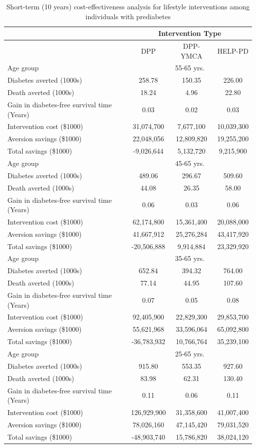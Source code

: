 \documentclass[fleqn,10pt]{wlscirep}
\begin{document}
\begin{table}[ht]
\centering
\begin{tabular}{lccc}
\hline
& \multicolumn{3}{c}{Intervention Type}\\
\hline
& DPP & DPP-YMCA & HELP-PD\\
\hline
Age group & \multicolumn{3}{c}{55-65 yrs.}\\
\hline
Diabetes averted (1000s) & 258.78 & 150.35 & 226.00\\
Death averted (1000s) & 18.24 & 4.96 & 22.80\\
Gain in diabetes-free survival time (Years) & 0.03 & 0.02 & 0.03\\
Intervention cost (\$1000) & 31,074,700 & 7,677,100 & 10,039,300\\
Aversion savings (\$1000) & 22,048,056 & 12,809,820 & 19,255,200\\
Total savings (\$1000) & -9,026,644 & 5,132,720 & 9,215,900\\
\hline
Age group & \multicolumn{3}{c}{45-65 yrs.}\\
\hline
Diabetes averted (1000s) & 489.06 &	296.67 &	509.60\\
Death averted (1000s) & 44.08 &	26.35 &	58.00\\
Gain in diabetes-free survival time (Years) & 0.06 & 0.03 &	0.06\\
Intervention cost (\$1000) & 62,174,800 &	15,361,400 &	20,088,000\\
Aversion savings (\$1000) & 41,667,912 &	25,276,284 &	43,417,920\\
Total savings (\$1000) & -20,506,888 &	9,914,884 &	23,329,920\\
\hline
Age group & \multicolumn{3}{c}{35-65 yrs.}\\
\hline
Diabetes averted (1000s) & 652.84 &	394.32 &	764.00\\
Death averted (1000s) & 77.14 &	44.95 &	107.60\\
Gain in diabetes-free survival time (Years) & 0.07 &	0.05 &	0.08\\
Intervention cost (\$1000) & 92,405,900 &	22,829,300 &	29,853,700\\
Aversion savings (\$1000) & 55,621,968 &	33,596,064 &	65,092,800\\
Total savings (\$1000) & -36,783,932 &	10,766,764 &	35,239,100\\
\hline
Age group & \multicolumn{3}{c}{25-65 yrs.}\\
\hline
Diabetes averted (1000s) & 915.80 &	553.35 &	927.60\\
Death averted (1000s) & 83.98 &	62.31 &	130.40\\
Gain in diabetes-free survival time (Years) & 0.11 &	0.06 &	0.11\\
Intervention cost (\$1000) & 126,929,900 &	31,358,600 &	41,007,400\\
Aversion savings (\$1000) & 78,026,160 &	47,145,420 &	79,031,520\\
Total savings (\$1000) & -48,903,740 &	15,786,820 &	38,024,120\\
\hline
\end{tabular}
\caption{\label{tab:age}Short-term (10 years) cost-effectiveness analysis for lifestyle interventions among individuals with prediabetes}
\end{table}
\end{document}
